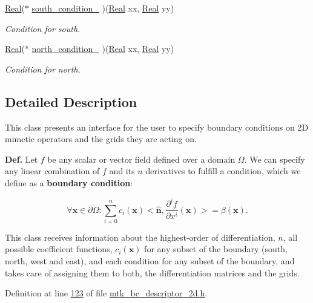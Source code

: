 \begin{DoxyCompactItemize}
\hyperlink{group__c01-roots_gac080bbbf5cbb5502c9f00405f894857d}{Real}($\ast$ \hyperlink{classmtk_1_1BCDescriptor2D_a2a933b473abbe47ad7c79ef7939e7768}{south\+\_\+condition\+\_\+} )(\hyperlink{group__c01-roots_gac080bbbf5cbb5502c9f00405f894857d}{Real} xx, \hyperlink{group__c01-roots_gac080bbbf5cbb5502c9f00405f894857d}{Real} yy)
\begin{DoxyCompactList}\small\item\em Condition for south. \end{DoxyCompactList}\item 
\hyperlink{group__c01-roots_gac080bbbf5cbb5502c9f00405f894857d}{Real}($\ast$ \hyperlink{classmtk_1_1BCDescriptor2D_a23e0b9ae755dcf81841aa24ddaf0b090}{north\+\_\+condition\+\_\+} )(\hyperlink{group__c01-roots_gac080bbbf5cbb5502c9f00405f894857d}{Real} xx, \hyperlink{group__c01-roots_gac080bbbf5cbb5502c9f00405f894857d}{Real} yy)
\begin{DoxyCompactList}\small\item\em Condition for north. \end{DoxyCompactList}\end{DoxyCompactItemize}


\subsection{Detailed Description}
This class presents an interface for the user to specify boundary conditions on 2\+D mimetic operators and the grids they are acting on.

{\bfseries Def.} Let $ f $ be any scalar or vector field defined over a domain $ \Omega $. We can specify any linear combination of $ f $ and its $ n $ derivatives to fulfill a condition, which we define as a {\bfseries boundary condition}\+:

\[ \forall \mathbf{x} \in \partial\Omega: \sum_{i = 0}^{n} c_i(\mathbf{x}) <\hat{\mathbf{n}}, \frac{\partial^i f}{\partial x^i}(\mathbf{x})> = \beta(\mathbf{x}). \]

This class receives information about the highest-\/order of differentiation, $ n $, all possible coefficient functions, $ c_i(\mathbf{x}) $ for any subset of the boundary (south, north, west and east), and each condition for any subset of the boundary, and takes care of assigning them to both, the differentiation matrices and the grids. 

Definition at line \hyperlink{mtk__bc__descriptor__2d_8h_source_l00123}{123} of file \hyperlink{mtk__bc__descriptor__2d_8h_source}{mtk\+\_\+bc\+\_\+descriptor\+\_\+2d.\+h}.



